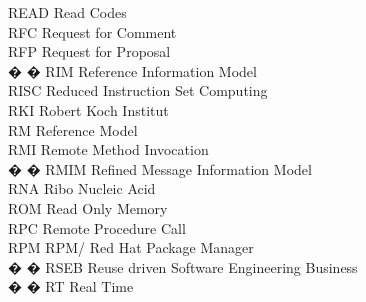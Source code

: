 \begin{tabbing}

    \>READ \>\>Read Codes\\


    \>RFC \>\>Request for Comment\\

    \>RFP \>\>Request for Proposal\\

� � \>RIM \>\>Reference Information Model\\



    \>RISC \>\>Reduced Instruction Set Computing\\

    \>RKI \>\>Robert Koch Institut\\

    \>RM \>\>Reference Model\\

    \>RMI \>\>Remote Method Invocation\\

� � \>RMIM \>\>Refined Message Information Model\\

    \>RNA \>\>Ribo Nucleic Acid\\


    \>ROM \>\>Read Only Memory\\

    \>RPC \>\>Remote Procedure Call\\

    \>RPM \>\>RPM/ Red Hat Package Manager\\

� � \>RSEB \>\>Reuse driven Software Engineering Business\\



� � \>RT \>\>Real Time\\


\end{tabbing}
